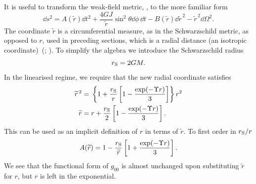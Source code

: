 It is useful to transform the weak-field metric, , to the more familiar form
\begin{equation}
\dd s^2 = A(\widetilde{r}) \dd t^2 + \frac{4GJ}{\widetilde{r}} \sin^2\theta \dd \phi \,\dd t - B(\widetilde{r})\dd \widetilde{r}^{\,2} - \widetilde{r}^{\,2} \dd \Omega^2.
\label{eq:Sph_sym}
\end{equation}
The coordinate $\widetilde{r}$ is a circumferential measure, as in the Schwarzschild metric, as opposed to $r$, used in preceding sections, which is a radial distance (an isotropic coordinate)~(\citealt[section 40.1]{Misner1973}; \citealt{Olmo2007c}). To simplify the algebra we introduce the Schwarzschild radius
\begin{equation}
r_\mathrm{S} = 2GM.
\end{equation}
In the linearised regime, we require that the new radial coordinate satisfies
\begin{align}
\widetilde{r}^{\,2} = {} & \left\{1 + \frac{r_\mathrm{S}}{r}\left[1 - \frac{\exp(-\Upsilon r)}{3}\right]\right\}r^2 \\
\widetilde{r} = {} & r + \frac{r_\mathrm{S}}{2}\left[1 - \frac{\exp(-\Upsilon r)}{3}\right].
\label{eq:r_tilde}
\end{align}
This can be used as an implicit definition of $r$ in terms of $\widetilde{r}$. To first order in ${r_\mathrm{S}}/{r}$ \citep{Olmo2007c}
\begin{equation}
A(\widetilde{r}) = 1 - \frac{r_\mathrm{S}}{\widetilde{r}}\left[1 + \frac{\exp(-\Upsilon r )}{3}\right].
\label{eq:A_metric}
\end{equation}
We see that the functional form of $g_{00}$ is almost unchanged upon substituting $\widetilde{r}$ for $r$, but $r$ is left in the exponential.

